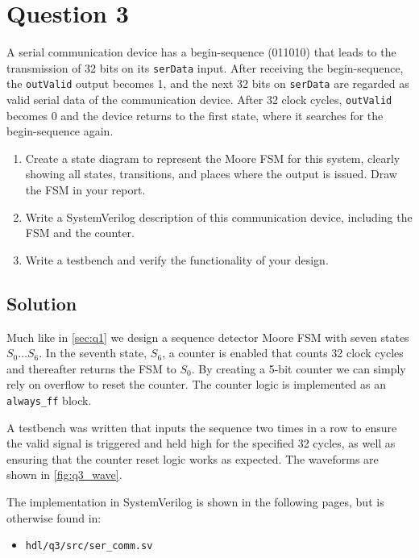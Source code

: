 \documentclass[../main.tex]{subfiles}
\begin{document}
\newpage

\section{Question 3}

A serial communication device has a begin-sequence (011010) that leads to the transmission of 32 bits on its \lstinline{serData} input. After receiving the begin-sequence, the \lstinline{outValid} output becomes 1, and the next 32 bits on \lstinline{serData} are regarded as valid serial data of the communication device. After 32 clock cycles, \lstinline{outValid} becomes 0 and the device returns to the first state, where it searches for the begin-sequence again.

\begin{enumerate}
    \item Create a state diagram to represent the Moore FSM for this system, clearly showing all states, transitions, and places where the output is issued. Draw the FSM in your report.
    \item Write a SystemVerilog description of this communication device, including the FSM and the counter.
    \item Write a testbench and verify the functionality of your design.
\end{enumerate}

\subsection*{Solution}

Much like in \cref{sec:q1} we design a sequence detector Moore FSM with seven states $S_0 \ldots S_6$. In the seventh state, $S_6$, a counter is enabled that counts 32 clock cycles and thereafter returns the FSM to $S_0$. By creating a 5-bit counter we can simply rely on overflow to reset the counter. The counter logic is implemented as an \lstinline{always_ff} block.

A testbench was written that inputs the sequence two times in a row to ensure the valid signal is triggered and held high for the specified 32 cycles, as well as ensuring that the counter reset logic works as expected. The waveforms are shown in \cref{fig:q3_wave}.

The implementation in SystemVerilog is shown in the following pages, but is otherwise found in:

\begin{itemize}
    \item \lstinline{hdl/q3/src/ser_comm.sv}
\end{itemize}
\end{document}
